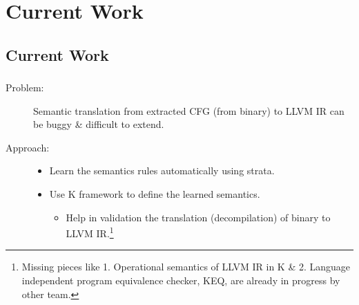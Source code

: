 \documentclass[mathserif,12pt,unknownkeysallowed]{beamer}
\begin{document}
\section*{Current Work}
  \subsection*{Current Work}
  \frame
  {
    \frametitle{\subsecname}
    \begin{description}
      \item [Problem:] Semantic translation from extracted CFG (from binary) to LLVM IR can be buggy \& difficult to extend.
      \item [Approach:]
        \begin{itemize}
          \item Learn the semantics rules automatically using strata.
          \item Use K framework to define the learned semantics.
          \begin{itemize}
            \item Help in validation the translation (decompilation) of binary to LLVM IR.\footnote{ Missing pieces like 1. Operational semantics  of LLVM IR in K \& 2. Language independent program equivalence checker, KEQ, are already in progress by other team.}
          \end{itemize}
        \end{itemize}
    \end{description}

  }
\end{document}
